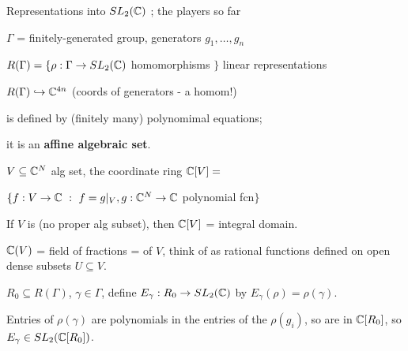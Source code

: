 




\loadmsbm

\def\ctln{\centerline}
\def\u{\underbar}
\def\ssk{\smallskip}
\def\msk{\medskip}
\def\bsk{\bigskip}
\def\hsk{\hskip.1in}
\def\hhsk{\hskip.2in}

\def\dsl{\displaystyle}
\def\hskp{\hskip1.5in}
\def\ra{\rightarrow}
\def\lra{$\Leftrightarrow$}
\def\pu{\pi_1}
\def\mpu{$\pi_1$}
\def\bra{$\Rightarrow$}
\def\bbr{{\Bbb R}}
\def\bbc{{\Bbb C}}
\def\bbz{{\Bbb Z}}
\def\del{\partial}
\def\indt{\item{}}

\nopagenumbers
\parindent=0pt

\centerline{Representations into $SL_2(\bbc)$ ; the players so far}

\bsk

$\Gamma$ = finitely-generated group, generators $g_1,\ldots,g_n$

\msk

$R(\Gamma)=\{\rho:\Gamma\ra SL_2(\bbc)$ homomorphisms $\}$ linear representations

\msk

$R(\Gamma)\hookrightarrow\bbc^{4n}$ (coords of generators -  a homom!) 

\ssk

is defined by (finitely many) polynomimal equations; 

it is an {\bf affine algebraic set}.

\msk

$V\subseteq\bbc^N$ alg set, the coordinate ring $\bbc[V] = $

$\{f:V\ra\bbc\ :\ f=g|_V, g:\bbc^N\ra \bbc$ polynomial fcn$\}$

\ssk

If $V$ is  (no proper alg subset), then $\bbc[V]$ = integral domain.

$\bbc(V)$ = field of fractions =   of $V$, think of as rational functions
defined on open dense subsets $U\subseteq V$.

\msk

$R_0\subseteq R(\Gamma)$, $\gamma\in\Gamma$, define $E_\gamma:R_0\ra SL_2(\bbc)$ by $E_\gamma(\rho)=\rho(\gamma)$.

\ssk

Entries of $\rho(\gamma)$ are polynomials in the entries of the $\rho(g_i)$, so are in $\bbc[R_0]$, so
$E_\gamma\in SL_2(\bbc[R_0])$.

